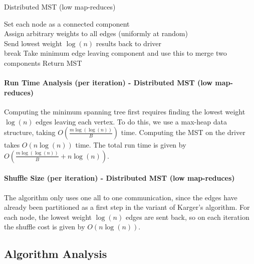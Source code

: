 \documentclass[12pt]{article}
\begin{document}
\LinesNumbered
\begin{algorithm}[H]
\caption{Distributed MST (low map-reduces)}
Set each node as a connected component \\
Assign arbitrary weights to all edges (uniformly at random) \\
 {
  Send lowest weight $\log(n)$ results back to driver \\
   {
     {
    break
    }
     {
      Take minimum edge leaving component and use this to merge two
      components
    }
  }
}
Return MST
\end{algorithm}

\paragraph{Run Time Analysis (per iteration) - Distributed MST (low map-reduces)}

Computing the minimum spanning tree first requires finding the lowest weight $\log(n)$ edges leaving each vertex. To do this, we use a max-heap data structure, taking $O(\frac{m\log(\log(n))}{B})$ time. Computing the MST on the driver takes $O(n \log(n))$ time. The total run time is given by $O(\frac{m \log(\log(n))}{B} + n\log(n))$.

\paragraph{Shuffle Size (per iteration) - Distributed MST (low map-reduces)}

The algorithm only uses one all to one communication, since the edges have already been partitioned as a first step in the variant of Karger's algorithm. For each node, the lowest weight $\log(n)$ edges are sent back, so on each iteration the shuffle cost is given by $O(n\log(n))$.

\subsection{Algorithm Analysis}
\end{document}
